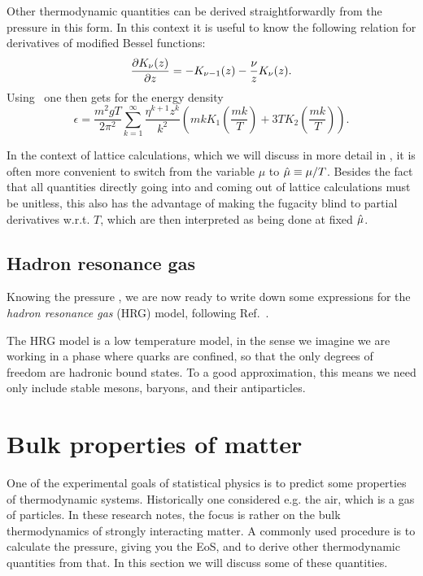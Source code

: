 Other thermodynamic quantities can be derived straightforwardly
from the pressure in this form. In this context it is useful to know
the following relation for derivatives of modified Bessel functions:
\begin{equation}
  \pdv{K_\nu(z)}{z}=-K_{\nu-1}(z)-\frac{\nu}{z}K_\nu(z).
\end{equation}
Using~ one then gets for the energy density
\begin{equation}\label{eq:edensityQM}
  \epsilon=\frac{m^2gT}{2\pi^2}\sum_{k=1}^\infty\frac{\eta^{k+1}z^k}{k^2}
              \left( mk K_1\left(\frac{mk}{T}\right) 
                    + 3TK_2\left(\frac{mk}{T}\right) \right).
\end{equation}

In the context of lattice calculations, which we will discuss in more
detail in , it is often more convenient to switch
from the variable $\mu$ to $\hat{\mu}\equiv\mu/T$. Besides the fact that
all quantities directly going into and coming out of lattice calculations
must be unitless, this also has the advantage of making the
fugacity blind to partial derivatives w.r.t. $T$, which are then 
interpreted as being done at fixed $\hat{\mu}$.

\subsection{Hadron resonance gas}\label{sec:HRG}

Knowing the pressure , we are now ready to write down
some expressions for the {\it hadron resonance gas} (HRG) model,
following Ref.~\cite{karsch_probing_2011}.

The HRG model is a low temperature model, in the sense we imagine we are working
in a phase where quarks are confined, so that the only degrees of freedom are
hadronic bound states. To a good approximation, this means we need only include
stable mesons, baryons, and their antiparticles.

\section{Bulk properties of matter}

One of the experimental goals of statistical physics is to predict some
properties of thermodynamic systems. Historically one considered e.g.
the air, which is a gas of particles. In these research notes, the focus
is rather on the bulk thermodynamics of strongly interacting matter.
A commonly used procedure is to calculate the pressure, giving
you the EoS, and to derive other thermodynamic quantities from that.
In this section we will discuss some of these quantities.

